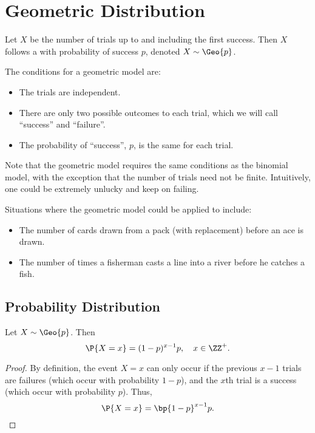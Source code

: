 \section{Geometric Distribution}

\begin{definition}
    Let $X$ be the number of trials up to and including the first success. Then $X$ follows a  with probability of success $p$, denoted $X \sim \Geo{p}$.
\end{definition}

\begin{condition}
    The conditions for a geometric model are:
    \begin{itemize}
        \item The trials are independent.
        \item There are only two possible outcomes to each trial, which we will call ``success'' and ``failure''.
        \item The probability of ``success'', $p$, is the same for each trial.
    \end{itemize}
\end{condition}

Note that the geometric model requires the same conditions as the binomial model, with the exception that the number of trials need not be finite. Intuitively, one could be extremely unlucky and keep on failing.

Situations where the geometric model could be applied to include:
\begin{itemize}
    \item The number of cards drawn from a pack (with replacement) before an ace is drawn.
    \item The number of times a fisherman casts a line into a river before he catches a fish.
\end{itemize}

\subsection{Probability Distribution}

\begin{proposition}
    Let $X \sim \Geo{p}$. Then \[\P{X = x} = (1-p)^{x-1} p, \quad x \in \ZZ^+.\]
\end{proposition}
\begin{proof}
    By definition, the event $X = x$ can only occur if the previous $x - 1$ trials are failures (which occur with probability $1-p$), and the $x$th trial is a success (which occur with probability $p$). Thus, \[\P{X = x} = \bp{1 - p}^{x-1} p.\]
\end{proof}


